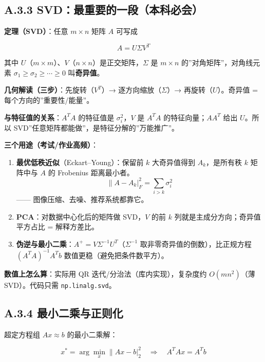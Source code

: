\subsection{A.3.3
SVD：最重要的一段（本科必会）}\label{a.3.3-svdux6700ux91cdux8981ux7684ux4e00ux6bb5ux672cux79d1ux5fc5ux4f1a}

\textbf{定理（SVD）}：任意 \(m\times n\) 矩阵 \(A\) 可写成

\[A = U\Sigma V^T\]

其中
\(U\)（\(m\times m\)）、\(V\)（\(n\times n\)）是正交矩阵，\(\Sigma\) 是
\(m\times n\) 的''对角矩阵''，对角线元素
\(\sigma_1\ge\sigma_2\ge\cdots\ge 0\) 叫\textbf{奇异值}。

\textbf{几何解读（三步）}：先旋转（\(V^T\)）→ 逐方向缩放（\(\Sigma\)）→
再旋转（\(U\)）。奇异值 = 每个方向的''重要性/能量''。

\textbf{与特征值的关系}：\(A^TA\) 的特征值是 \(\sigma_i^2\)，\(V\) 是
\(A^TA\) 的特征向量；\(AA^T\) 给出 \(U\)。所以
SVD''任意矩阵都能做''，是特征分解的''万能推广''。

\textbf{三个用途（考试/作业高频）}：

\begin{enumerate}
\def\labelenumi{\arabic{enumi}.}
\tightlist
\item
  \textbf{最优低秩近似}（Eckart--Young）：保留前 \(k\) 大奇异值得到
  \(A_k\)，是所有秩 \(k\) 矩阵中与 \(A\) 的 Frobenius
  距离最小者。\[\|A-A_k|_F^2 = \sum_{i>k}\sigma_i^2\] ------
  图像压缩、去噪、推荐系统都靠它。
\item
  \textbf{PCA}：对数据中心化后的矩阵做 SVD，\(V\) 的前 \(k\)
  列就是主成分方向；奇异值平方占比 = 解释方差比。
\item
  \textbf{伪逆与最小二乘}：\(A^{+}=V\Sigma^{-1}U^T\)（\(\Sigma^{-1}\)
  取非零奇异值的倒数），比正规方程 \((A^TA)^{-1}A^Tb\)
  数值更稳（避免把条件数平方）。
\end{enumerate}

\textbf{数值上怎么算}：实际用 QR 迭代/分治法（库内实现），复杂度约
\(O(mn^2)\)（薄 SVD）。代码只需 \texttt{np.linalg.svd}。

\subsection{A.3.4
最小二乘与正则化}\label{a.3.4-ux6700ux5c0fux4e8cux4e58ux4e0eux6b63ux5219ux5316}

超定方程组 \(Ax\approx b\) 的最小二乘解：

\[x^{*} = \arg\min_x\|Ax-b|_2^2 \quad\Longrightarrow\quad A^TAx = A^Tb\]

